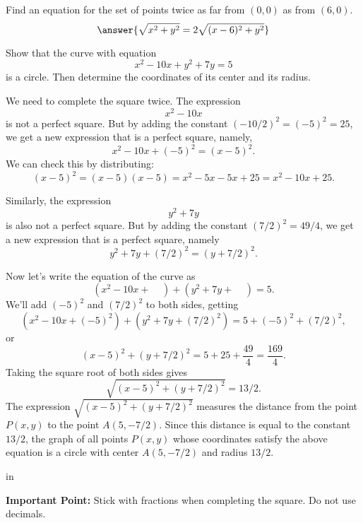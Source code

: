 \documentclass{ximera}
\newcommand{\pskip}{\vskip 0.1 in}
\begin{document}
\begin{question} 
Find an equation for the set of points twice as far from $(0,0)$ as from $(6,0)$. 
\[
  \answer{\sqrt{x^2+y^2} = 2 \sqrt{(x-6)^2+y^2}} 
\]
    \end{question}




\begin{example}
Show that the curve with equation
\[
   x^2  - 10x + y^2 + 7y = 5
\]
is a circle. Then determine the coordinates of its center and its radius.
\end{example}


\begin{explanation}
We need to complete the square twice. The expression
\[
     x^2 - 10x
\]
is not a perfect square. But by adding the constant $(-10/2)^2 = (-5)^2 = 25$, we get a new expression that is a perfect square, namely,
\[
     x^2 -10x + (-5)^2 = (x-5)^2 .
\]
We can check this by distributing:
\[
    (x-5)^2 = (x-5)(x-5) = x^2 -5x -5x + 25 = x^2 - 10x + 25 .
\]

Similarly, the expression
\[
   y^2 + 7y
\]
is also not a perfect square. But by adding the constant $(7/2)^2 = 49/4$, we get a new expression that is a perfect square, namely
\[
     y^2 + 7y + (7/2)^2 = (y+7/2)^2 .
\]

Now let's write the equation of the curve as
\[
     (x^2  - 10x + \;\;\;\; ) + (y^2 + 7y + \;\;\;\; ) = 5 .
\]
We'll add $(-5)^2$ and $(7/2)^2$ to both sides, getting
\[
     (x^2  - 10x + (-5)^2 ) + (y^2 + 7y + (7/2)^2 ) = 5 + (-5)^2 + (7/2)^2 ,
\]
or
\[
    (x-5)^2 + (y+7/2)^2 = 5 + 25 + \frac{49}{4} = \frac{169}{4} .
\]
Taking the square root of both sides gives
\[
    \sqrt{(x-5)^2 + (y+7/2)^2} = 13/2 .
\]
The expression $\sqrt{(x-5)^2 + (y+7/2)^2}$ measures the distance from the point $P(x,y)$ to the point $A(5,-7/2)$. Since this distance is equal to the constant $13/2$, the graph of all points $P(x,y)$ whose coordinates satisfy the above equation is a circle with center $A(5,-7/2)$ and radius $13/2$.

\pskip 

{\bf Important Point:} Stick with fractions when completing the square. Do not use decimals.

\end{explanation}
\end{document}

